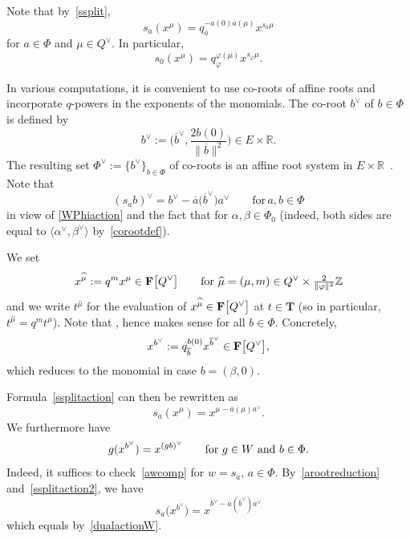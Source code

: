 \documentclass[11pt]{article}
\numberwithin{equation}{section}
\numberwithin{equation}{section}
\begin{document}
Note that by~\eqref{ssplit},
\begin{equation}\label{ssplitaction}
s_a(x^\mu)=q_{\overline{a}}^{-a(0)\overline{a}(\mu)}x^{s_{\overline{a}}\mu}
\end{equation}
for $a\in\Phi$ and $\mu\in Q^\vee$. In particular,
\begin{equation*}%
s_0(x^\mu)=q_\varphi^{\varphi(\mu)}x^{s_\varphi\mu}.
\end{equation*}

In various computations, it is convenient to use co-roots of affine roots and incorporate $q$-powers in the exponents of the monomials. The co-root $b^\vee$ of $b\in\Phi$ is defined by
\[
b^\vee:=\biggl(\overline{b}^\vee,\frac{2b(0)}{\|\overline{b}\|^2}\biggr)\in E\times\mathbb{R}.
\]
The resulting set $\Phi^\vee:=\{b^\vee\}_{b\in\Phi}$ of co-roots is an affine root system in $E\times\mathbb{R}$~\cite{MacAff}. Note that
\begin{equation}\label{dualactionW}
(s_ab)^\vee=b^\vee-\overline{a}\bigl(\overline{b}^\vee\bigr)a^\vee\qquad \text{for}\, a,b\in\Phi
\end{equation}
in view of
\eqref{WPhiaction} and the fact that  for $\alpha,\beta\in\Phi_0$ (indeed, both sides are equal to $\langle\alpha^\vee,\beta^\vee\rangle$ by~\eqref{corootdef}).

We set
\[
x^{\widehat{\mu}}:=q^mx^\mu\in\mathbf{F}\smash{\bigl[Q^\vee\bigr]}\qquad\textup{for}\ \widehat{\mu}=(\mu,m)\in Q^\vee\times \tfrac{2}{\|\varphi\|^2}\mathbb{Z}
\]
and we write $t^{\widehat{\mu}}$ for the evaluation of $x^{\widehat{\mu}}\in\mathbf{F}\smash{\bigl[Q^\vee\bigr]}$ at $t\in\mathbf{T}$ \big(so in particular, $t^{\widehat{\mu}}=q^mt^\mu$\big).
Note that , hence  makes sense for all $b\in\Phi$. Concretely,
\begin{equation}\label{arootreduction}
x^{b^\vee}:=q_{\overline{b}}^{b(0)}x^{\overline{b}^\vee}\in\mathbf{F}\smash{\bigl[Q^\vee\bigr]},
\end{equation}
which reduces to the monomial  in case $b=(\beta,0)$.

Formula~\eqref{ssplitaction} can then be rewritten as
\begin{equation}\label{ssplitaction2}
s_a(x^\mu)=x^{\mu-\overline{a}(\mu)a^\vee}.
\end{equation}
We furthermore have
\begin{equation}\label{awcomp}
g(x^{b^\vee})=x^{(gb)^\vee}\qquad \textup{for}\ g\in W\ \text{and}\ b\in\Phi.
\end{equation}
Indeed, it suffices to check~\eqref{awcomp} for $w=s_a$, $a\in\Phi$. By~\eqref{arootreduction} and~\eqref{ssplitaction2}, we have
\[
s_a\bigl(x^{b^\vee}\bigr)=x^{b^\vee-\overline{a}(\overline{b}^\vee)a^\vee}
\]
which equals  by~\eqref{dualactionW}.
\end{document}
